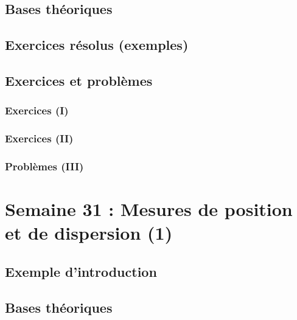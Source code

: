 \documentclass[
  12pt,
]{book}
\begin{document}
\hypertarget{bases-thuxe9oriques-29}{%
\section{Bases théoriques}\label{bases-thuxe9oriques-29}}

\hypertarget{exercices-ruxe9solus-exemples-29}{%
\section{Exercices résolus (exemples)}\label{exercices-ruxe9solus-exemples-29}}

\hypertarget{exercices-et-probluxe8mes-29}{%
\section{Exercices et problèmes}\label{exercices-et-probluxe8mes-29}}

\hypertarget{exercices-i-29}{%
\subsection{Exercices (I)}\label{exercices-i-29}}

\hypertarget{exercices-ii-29}{%
\subsection{Exercices (II)}\label{exercices-ii-29}}

\hypertarget{probluxe8mes-iii-29}{%
\subsection{Problèmes (III)}\label{probluxe8mes-iii-29}}

\hypertarget{semaine-31-mesures-de-position-et-de-dispersion-1}{%
\chapter{Semaine 31 : Mesures de position et de dispersion (1)}\label{semaine-31-mesures-de-position-et-de-dispersion-1}}

\hypertarget{exemple-dintroduction-30}{%
\section{Exemple d'introduction}\label{exemple-dintroduction-30}}

\hypertarget{bases-thuxe9oriques-30}{%
\section{Bases théoriques}\label{bases-thuxe9oriques-30}}
\end{document}
